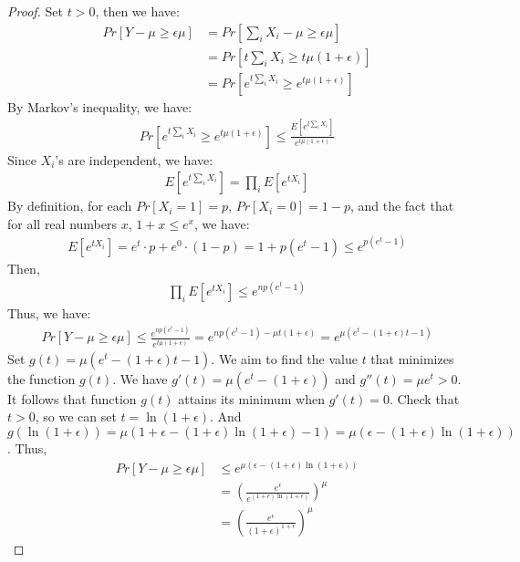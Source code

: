 \begin{proof}
Set $t>0$, then we have:
\begin{align}
    \nonumber Pr[Y-\mu \ge \epsilon \mu] &=Pr[\sum_{i}X_i-\mu \ge \epsilon \mu]\\
    \nonumber &=Pr[t\sum_{i}X_i \ge t\mu(1+\epsilon)]\\
    \nonumber &=Pr[e^{t\sum_{i}X_i } \ge e^{t\mu(1+\epsilon)}]
\end{align}
By Markov's inequality, we have:
\begin{align}
    \nonumber Pr[e^{t\sum_{i}X_i } \ge e^{t\mu(1+\epsilon)}] \le \frac{E[e^{t\sum_{i}X_i }]}{e^{t\mu(1+\epsilon)}}
\end{align}
Since $X_i$'s are independent, we have:
\begin{align}
    \nonumber E[e^{t\sum_{i}X_i }]=\prod_{i}E[e^{tX_i}]
\end{align}
By definition, for each $Pr[X_i=1]=p$, $Pr[X_i=0]=1-p$, and the fact that for all real numbers $x$, $1+x\le e^x$, we have:
\begin{align}
    \nonumber E[e^{tX_i}]=e^t\cdot p+e^0 \cdot (1-p)=1+p(e^t-1) \le e^{p(e^t-1)}
\end{align}
Then,
\begin{align}
    \nonumber \prod_{i}E[e^{tX_i}]\le e^{np(e^t-1)}
\end{align}
Thus, we have:
\begin{align}
    \nonumber Pr[Y-\mu \ge \epsilon \mu] \le \frac{e^{np(e^t-1)}}{e^{t\mu(1+\epsilon)}}=e^{np(e^t-1)-\mu t(1+\epsilon)}=e^{\mu(e^t-(1+\epsilon)t-1)}
\end{align}
Set $g(t)=\mu(e^t-(1+\epsilon)t-1)$. We aim to find the value $t$ that minimizes the function $g(t)$.
We have $g'(t)=\mu(e^t-(1+\epsilon))$ and $g''(t)=\mu e^t >0$. It follows that function $g(t)$ attains its minimum when $g'(t) = 0$.
Check that $t>0$, so we can set $t=\ln{(1+\epsilon)}$.
And $g(\ln{(1+\epsilon)})=\mu(1+\epsilon-(1+\epsilon)\ln{(1+\epsilon)}-1)=\mu(\epsilon-(1+\epsilon)\ln(1+\epsilon))$.
Thus,
\begin{align}
    \nonumber Pr[Y-\mu \ge \epsilon \mu] &\le e^{\mu(\epsilon-(1+\epsilon)\ln(1+\epsilon))}\\
    \nonumber &=(\frac{e^\epsilon}{e^{(1+\epsilon)\ln(1+\epsilon)}})^{\mu}\\
    \nonumber &=(\frac{e^\epsilon}{(1+\epsilon)^{1+\epsilon}})^{\mu}
\end{align}
\end{proof}
\noindent{}\\
